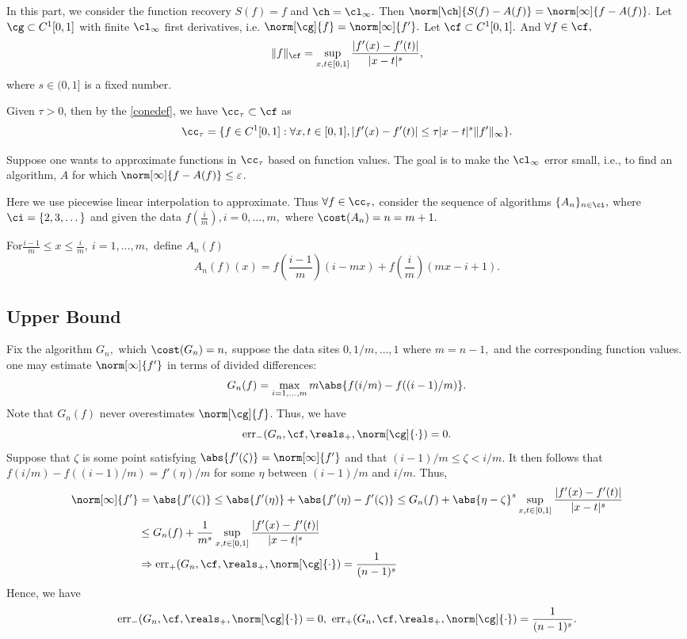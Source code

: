 
In this part, we consider the function recovery $S(f)=f$ and $\ch=\cl_{\infty}.$
Then $\norm[\ch]{S(f)-A(f)}=\norm[\infty]{f-A(f)}.$
Let $\cg \subset C^{1}[0,1]$ with finite $\cl_{\infty}$ first derivatives, i.e. $\norm[\cg]{f}=\norm[\infty]{f'}.$
Let $\cf \subset C^{1}[0,1].$ And $\forall f \in \cf,$
 $$\|f\|_{\cf}=\sup\limits_{x,t \in [0,1]}\frac{|f'(x)-f'(t)|}{|x-t|^{s}},$$ where $s \in (0,1]$ is a fixed number.


Given $\tau>0$, then by the \eqref{conedef}, we have $\cc_{\tau} \subset \cf$ as
\begin{equation}\label{ctapprox}
\cc_{\tau}=\{f \in  C^{1}[0,1] : \forall x,t \in [0,1], |f'(x)-f'(t)|\leq \tau|x-t|^{s} \|f'\|_{\infty} \}.
\end{equation}

Suppose one wants to approximate functions in $\cc_{\tau}$ based on function values.  The goal is to make the $\cl_{\infty}$ error small, i.e., to find an algorithm, $A$ for which $\norm[\infty]{f-A(f)} \le \varepsilon$.

Here we use piecewise linear interpolation to approximate. Thus $\forall f \in \cc_{\tau},$ consider the sequence of algorithms $\{A_n\}_{n \in \ci},$ where
$\ci=\{2,3,\dots\}$
 and given the data $f\left(\frac{i}{m}\right), i=0, \ldots,m,$ where $\cost(A_{n})=n=m+1.$

For$\frac{i-1}{m} \leq x \leq \frac{i}{m}, \ i=1, \ldots, m,$ define $A_{n}(f)$
$$A_{n}(f)(x)=f\left(\frac{i-1}{m}\right)(i-mx)+f\left(\frac{i}{m}\right)(mx-i+1).$$


\subsection{Upper Bound}


Fix the algorithm $G_n,$ which $\cost(G_n)=n,$
suppose the data sites $0, 1/m, \dots, 1$ where $m=n-1,$ and the corresponding function values. one may estimate $\norm[\infty]{f'}$ in terms of divided differences:
\begin{equation}
G_{n}(f)= \max_{i=1, \ldots, m} m\abs{f(i/m)-f((i-1)/m)}.
\end{equation}
Note that $G_n(f)$ never overestimates $\norm[\cg]{f}$. Thus, we have
$$\err_{-}(G_n,\cf,\reals_{+},\norm[\cg]{\cdot})=0.$$
 Suppose that $\zeta$ is some point satisfying $\abs{f'(\zeta)} = \norm[\infty]{f'}$ and
that $(i-1)/m \le \zeta < i/m$.  It then follows that $f(i/m)-f((i-1)/m) = f'(\eta)/m$ for some $\eta$ between $(i-1)/m$ and $i/m$.  Thus,
\begin{align*}
\norm[\infty]{f'} &= \abs{f'(\zeta)}\leq \abs{f'(\eta)} + \abs{f'(\eta)-f'(\zeta) }  \le G_{n}(f) + \abs{ \eta-\zeta}^{s}\sup\limits_{x,t \in [0,1]}\frac{|f'(x)-f'(t)|}{|x-t|^{s}}\nonumber\\
& \leq  G_n(f) + \frac{1}{m^{s}} \sup\limits_{x,t \in [0,1]}\frac{|f'(x)-f'(t)|}{|x-t|^{s}}\nonumber\\
&\Rightarrow \err_{+}(G_n,\cf,\reals_{+},\norm[\cg]{\cdot}) =\frac{1}{(n-1)^{s}}
\end{align*}
Hence, we have
$$\err_{-}(G_n,\cf,\reals_{+},\norm[\cg]{\cdot})=0, \ \err_{+}(G_n,\cf,\reals_{+},\norm[\cg]{\cdot}) =\frac{1}{(n-1)^{s}}.
$$

